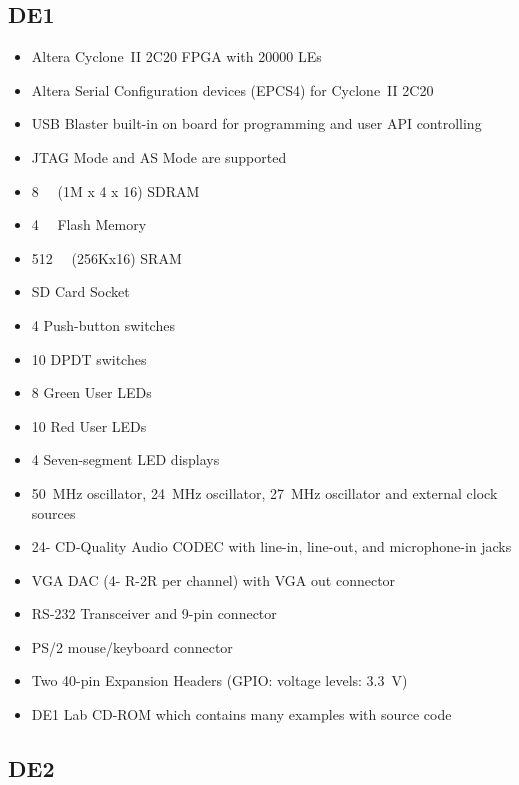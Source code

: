 \documentclass[12pt, logo=tehranDLDL/ut]{tehranDLDL}
\begin{document}
\subsection{DE1}

\begin{itemize}
    \item Altera Cyclone~II 2C20 FPGA with 20000 LEs
    \item Altera Serial Configuration devices (EPCS4) for Cyclone~II 2C20
    \item USB Blaster built-in on board for programming and user API controlling
    \item JTAG Mode and AS Mode are supported
    \item \SI{8}{\mega\byte} (1M x 4 x 16) SDRAM
    \item \SI{4}{\mega\byte} Flash Memory
    \item \SI{512}{\kilo\byte} (256Kx16) SRAM
    \item SD Card Socket
    \item 4 Push-button switches
    \item 10 DPDT switches
    \item 8 Green User LEDs
    \item 10 Red User LEDs
    \item 4 Seven-segment LED displays
    \item \SI{50}{\mega\hertz} oscillator, \SI{24}{\mega\hertz} oscillator, \SI{27}{\mega\hertz} oscillator and external clock sources
    \item 24-\SI{}{\bit} CD-Quality Audio CODEC with line-in, line-out, and microphone-in jacks
    \item VGA DAC (4-\SI{}{\bit} R-2R per channel) with VGA out connector
    \item RS-232 Transceiver and 9-pin connector
    \item PS/2 mouse/keyboard connector
    \item Two 40-pin Expansion Headers (GPIO: voltage levels: \SI{3.3}{\volt})
    \item DE1 Lab CD-ROM which contains many examples with source code
\end{itemize}

\subsection{DE2}
\end{document}
